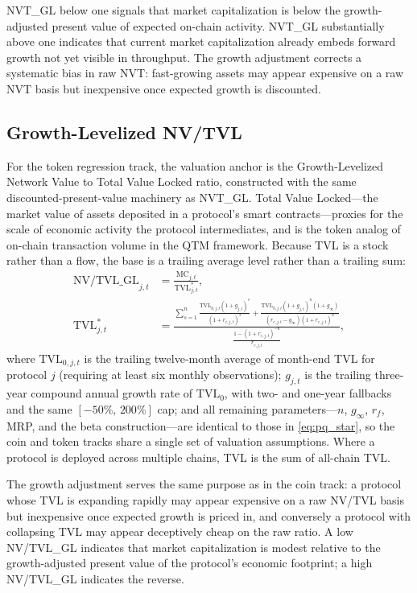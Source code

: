 \documentclass[12pt]{article}
\begin{document}
NVT\_GL below one signals that market capitalization is below the growth-adjusted present
value of expected on-chain activity. NVT\_GL substantially above one indicates that
current market capitalization already embeds forward growth not yet visible in throughput.
The growth adjustment corrects a systematic bias in raw NVT: fast-growing assets may
appear expensive on a raw NVT basis but inexpensive once expected growth is discounted.

\subsection{Growth-Levelized NV/TVL}
\label{sec:measures_tvl}

For the token regression track, the valuation anchor is the Growth-Levelized Network
Value to Total Value Locked ratio, constructed with the same discounted-present-value
machinery as NVT\_GL. Total Value Locked---the market value of assets deposited in a
protocol's smart contracts---proxies for the scale of economic activity the protocol
intermediates, and is the token analog of on-chain transaction volume in the QTM
framework. Because TVL is a stock rather than a flow, the base is a trailing average
level rather than a trailing sum:
\begin{align}
    \text{NV/TVL\_GL}_{j,t} &= \frac{\text{MC}_{j,t}}{\text{TVL}^*_{j,t}}, \label{eq:nv_tvl_gl} \\[6pt]
    \text{TVL}^*_{j,t} &= \frac{\displaystyle
        \sum_{s=1}^{n} \frac{\text{TVL}_{0,j,t}(1+g_{j,t})^{\!s}}{(1+r_{e,j,t})^{\!s}}
        + \frac{\text{TVL}_{0,j,t}(1+g_{j,t})^{\!n}(1+g_\infty)}{(r_{e,j,t}-g_\infty)(1+r_{e,j,t})^{\!n}}
    }{\displaystyle
        \frac{1-(1+r_{e,j,t})^{-n}}{r_{e,j,t}}
    }, \label{eq:tvl_star}
\end{align}
where $\text{TVL}_{0,j,t}$ is the trailing twelve-month average of month-end TVL for
protocol $j$ (requiring at least six monthly observations); $g_{j,t}$ is the trailing
three-year compound annual growth rate of $\text{TVL}_0$, with two- and one-year
fallbacks and the same $[-50\%,\,200\%]$ cap; and all remaining
parameters---$n$, $g_\infty$, $r_f$, MRP, and the beta construction---are identical to
those in \eqref{eq:pq_star}, so the coin and token tracks share a single set of
valuation assumptions. Where a protocol is deployed across multiple chains, TVL is the
sum of all-chain TVL.

The growth adjustment serves the same purpose as in the coin track: a protocol whose TVL
is expanding rapidly may appear expensive on a raw NV/TVL basis but inexpensive once
expected growth is priced in, and conversely a protocol with collapsing TVL may appear
deceptively cheap on the raw ratio. A low NV/TVL\_GL indicates that market capitalization
is modest relative to the growth-adjusted present value of the protocol's economic
footprint; a high NV/TVL\_GL indicates the reverse.
\end{document}

